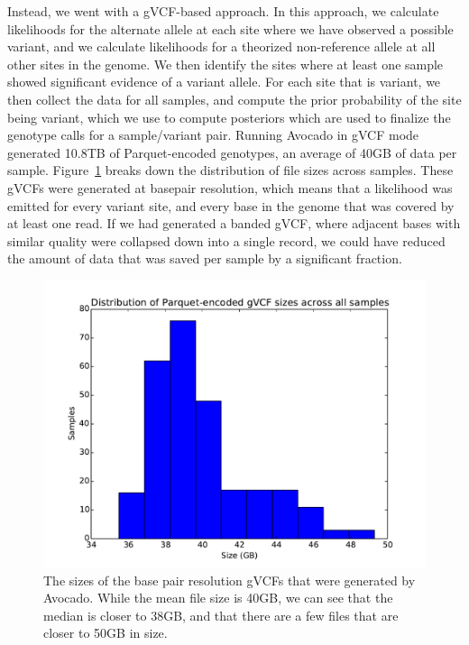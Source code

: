 \documentclass[phd]{ucbthesis}
\begin{document}
Instead, we went with a gVCF-based approach. In this approach, we calculate
likelihoods for the alternate allele at each site where we have observed a
possible variant, and we calculate likelihoods for a theorized non-reference
allele at all other sites in the genome. We then identify the sites where at
least one sample showed significant evidence of a variant allele. For each
site that is variant, we then collect the data for all samples, and compute
the prior probability of the site being variant, which we use to compute
posteriors which are used to finalize the genotype calls for a sample/variant
pair. Running Avocado in gVCF mode generated 10.8TB of Parquet-encoded
genotypes, an average of 40GB of data per sample. Figure~\ref{fig:gvcf-sizes}
breaks down the distribution of file sizes across samples. These gVCFs were
generated at basepair resolution, which means that a likelihood was emitted
for every variant site, and every base in the genome that was covered by at
least one read. If we had generated a banded gVCF, where adjacent bases with
similar quality were collapsed down into a single record, we could have reduced
the amount of data that was saved per sample by a significant fraction.

\begin{figure}[h]
  \begin{center}
    \includegraphics[width=0.95\linewidth]{graphs/gvcf_sizes.pdf}
  \end{center}
  \caption{The sizes of the base pair resolution gVCFs that were generated by
    Avocado. While the mean file size is 40GB, we can see that the median is
    closer to 38GB, and that there are a few files that are closer to 50GB in
    size.}
  \label{fig:gvcf-sizes}
\end{figure}
\end{document}
